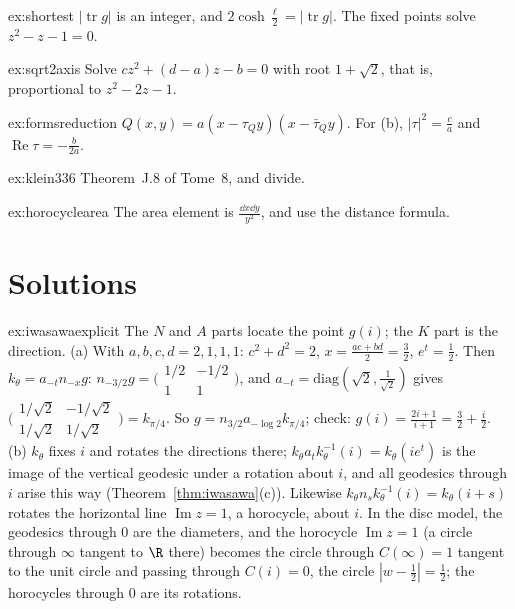 \begin{hint}{ex:shortest}
$|\operatorname{tr}g|$ is an integer, and $2\cosh\frac\ell2=|\operatorname{tr}g|$. The fixed points solve $z^2-z-1=0$.
\end{hint}

\begin{hint}{ex:sqrt2axis}
Solve $cz^2+(d-a)z-b=0$ with root $1+\sqrt2$, that is, proportional to $z^2-2z-1$.
\end{hint}

\begin{hint}{ex:formsreduction}
$Q(x,y)=a(x-\tau_Qy)(x-\bar\tau_Qy)$. For (b), $|\tau|^2=\frac ca$ and $\operatorname{Re}\tau=-\frac b{2a}$.
\end{hint}

\begin{hint}{ex:klein336}
Theorem~J.8 of Tome~8, and divide.
\end{hint}

\begin{hint}{ex:horocyclearea}
The area element is $\frac{\dd x\dd y}{y^2}$, and use the distance formula.
\end{hint}

\section{Solutions}

\begin{solution}{ex:iwasawaexplicit}
\idea The $N$ and $A$ parts locate the point $g(i)$; the $K$ part is the direction.
\writeup (a) With $a,b,c,d=2,1,1,1$: $c^2+d^2=2$, $x=\frac{ac+bd}2=\frac32$, $e^t=\frac12$. Then $k_\theta=a_{-t}n_{-x}g$: $n_{-3/2}g=\bigl(\begin{smallmatrix}1/2&-1/2\\1&1\end{smallmatrix}\bigr)$, and $a_{-t}=\mathrm{diag}(\sqrt2,\frac1{\sqrt2})$ gives
$\bigl(\begin{smallmatrix}1/\sqrt2&-1/\sqrt2\\1/\sqrt2&1/\sqrt2\end{smallmatrix}\bigr)=k_{\pi/4}$. So $g=n_{3/2}a_{-\log2}k_{\pi/4}$; check: $g(i)=\frac{2i+1}{i+1}=\frac32+\frac i2$. (b) $k_\theta$ fixes $i$ and rotates the directions there;
$k_\theta a_tk_\theta^{-1}(i)=k_\theta(ie^t)$ is the image of the vertical geodesic under a rotation about $i$, and all geodesics through $i$ arise this way (Theorem~\ref{thm:iwasawa}(c)). Likewise $k_\theta n_sk_\theta^{-1}(i)=k_\theta(i+s)$
rotates the horizontal line $\operatorname{Im}z=1$, a horocycle, about $i$. In the disc model, the geodesics through $0$ are the diameters, and the horocycle $\operatorname{Im}z=1$ (a circle through
$\infty$ tangent to $\R$ there) becomes the circle through $C(\infty)=1$ tangent to the unit circle and passing through $C(i)=0$, the circle $|w-\frac12|=\frac12$; the horocycles through $0$ are its
rotations.
\end{solution}

